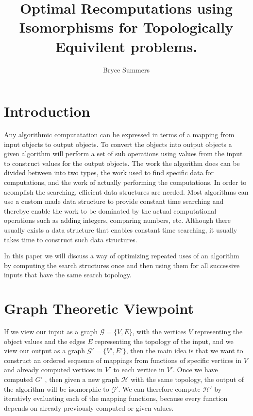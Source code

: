 \documentclass[11pt]{article} %
\title{Optimal Recomputations using Isomorphisms for Topologically Equivilent problems.}
\author{Bryce Summers}
\begin{document}
\maketitle

\section{Introduction}

Any algorithmic computatation can be expressed in terms of a mapping from input objects to output objects. To convert the objects into output objects a given algorithm will perform a set of sub operations using values from the input to construct values for the output objects. The work the algorithm does can be divided between into two types, the work used to find specific data for computations, and the work of actually performing the computations. In order to acomplish the searching, efficient data structures are needed. Most algorithms can use a custom made data structure to provide constant time searching and therebye enable the work to be dominated by the actual computational operations such as adding integers, comparing numbers, etc. Although there usually exists a data structure that enables constant time searching, it usually takes time to construct such data structures.

In this paper we will discuss a way of optimizing repeated uses of an algorithm by computing the search structures once and then using them for all successive inputs that have the same search topology.

\section{Graph Theoretic Viewpoint}

If we view our input as a graph $\mathcal{G} = \{V, E\}$, with the vertices $V$ representing the object values and the edges $E$ representing the topology of the input, and we view our output as a graph $\mathcal{G'} = \{V', E'\}$, then the main idea is that we want to construct an ordered sequence of mappings from functions of specific vertices in $V$ and already computed vertices in $V'$ to each vertice in $V'$. Once we have computed $G'$ , then given a new graph $\mathcal{H}$ with the same topology, the output of the algorithm will be isomorphic to $\mathcal{G}'$. We can therefore compute $\mathcal{H'}$ by iterativly evaluating each of the mapping functions, because every function depends on already previously computed or given values.\\
\end{document}
